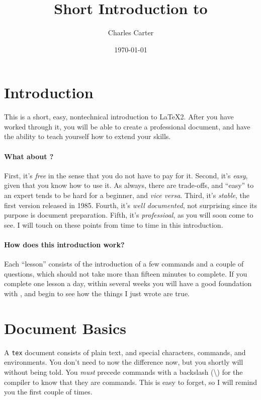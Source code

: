 \documentclass{article}
\title{Short Introduction to \LaTeXe}
\author{Charles Carter}
\date{\today{}}
\begin{document}
    \maketitle{}
    
    \tableofcontents{}

    \section{Introduction}
    \label{Introduction}

    This is a short, easy, nontechnical introduction to \LaTeX2{}. After you have worked through it, you will be able to create a professional document, and have the ability to teach yourself how to extend your \LaTeXe{} skills.

    \paragraph{What about \LaTeXe{}?}First, it's \textit{free} in the sense that you do not have to pay for it. Second, it's \textit{easy}, given that you know how to use it. As always, there are trade-offs, and ``easy'' to an expert tends to be hard for a beginner, and \textit{vice versa}. Third, it's \textit{stable}, the first version released in 1985. Fourth, it's \textit{well documented}, not surprising since its purpose is document preparation. Fifth, it's \textit{professioal}, as you will soon come to see. I will touch on these points from time to time in this introduction.

    \paragraph{How does this introduction work?}Each ``lesson'' consists of the introduction of a few commands and a couple of questions, which should not take more than fifteen minutes to complete. If you complete one lesson a day, within several weeks you will have a good foundation with \LaTeXe{}, and begin to see how the things I just wrote are true.

    \section{Document Basics}
    \label{Document-Basics}

    A \texttt{tex} document consists of plain text, and special characters, commands, and environments. You don't need to now the difference now, but you shortly will without being told. You \textit{must} precede commands with a backslash (\textbackslash{}) for the compiler to know that they are commands. This is easy to forget, so I will remind you the first couple of times.
\end{document}
